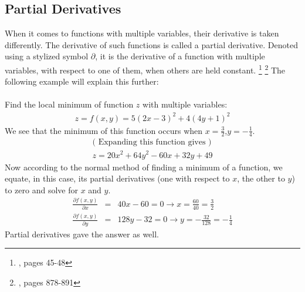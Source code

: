 \subsection{Partial Derivatives}
When it comes to functions with multiple variables, their derivative is taken differently. The derivative of such functions is called a partial derivative. Denoted using a stylized symbol $\partial$, it is the derivative of a function with multiple variables, with respect to one of them, when others are held constant. \footnote{\cite{matthews_1998}, pages 45-48} \footnote{\cite{stewart_2008_deriv}, pages 878-891} The following example will explain this further:\\
\\
Find the local minimum of function $z$ with multiple variables:
\begin{gather*}
z = f(x,y) = 5(2x-3)^{2} + 4(4y+1)^{2}
\end{gather*}
We see that the minimum of this function occurs when $x= \frac{3}{2} $,$ y= -\frac{1}{4}$.
\begin{gather*}
\text{( Expanding this function gives )}\\
z = 20x^{2} + 64y^{2} -60x + 32y +49
\end{gather*}
Now according to the normal method of finding a minimum of a function, we equate, in this case, its partial derivatives (one with respect to $x$, the other to $y$) to zero and solve for $x$ and $y$.
\begin{eqnarray*}
\frac{\partial f(x,y)}{\partial x}  &=&  40x-60 = 0 \rightarrow x = \frac{60}{40}=\frac{3}{2}\\
\frac{\partial f(x,y)}{\partial y}  &=&  128y-32 = 0 \rightarrow y = -\frac{32}{128}=-\frac{1}{4}
\end{eqnarray*}
Partial derivatives gave the answer as well.
